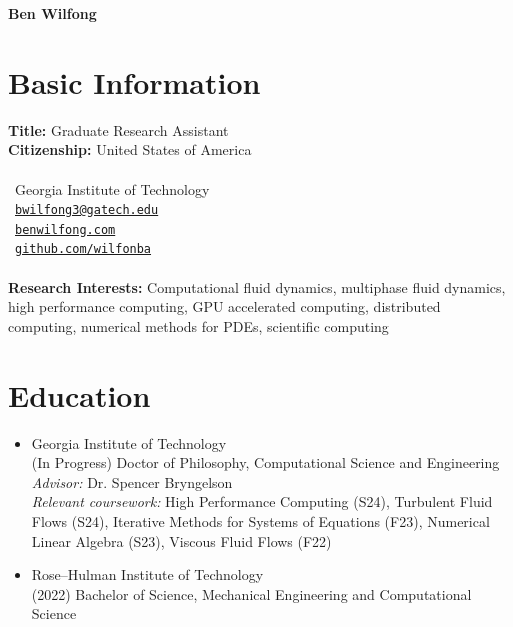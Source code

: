 \documentclass{article}
\begin{document}
\begin{center}
    \LARGE{\textbf{Ben Wilfong}}
\end{center}

\section{Basic Information}
\textbf{Title:} Graduate Research Assistant \\
\textbf{Citizenship:} United States of America \\~\\
\faBuilding\ Georgia Institute of Technology \\
\faEnvelopeSquare\ \href{mailto:bwilfong3@gatech.edu}{\texttt{bwilfong3@gatech.edu}} \\
\faArrowAltCircleRight\  \href{https://benwilfong.com}{\texttt{benwilfong.com}} \\
\faGithub\ \href{https://github.com/wilfonba}{\texttt{github.com/wilfonba}} \\~\\
\textbf{Research Interests:} Computational fluid dynamics, multiphase fluid dynamics, high performance computing, GPU accelerated computing, distributed computing, numerical methods for PDEs, scientific computing

\section{Education}
\begin{itemize}
    \item[\faGraduationCap] Georgia Institute of Technology \\
    \hspace*{0.25cm} (In Progress) Doctor of Philosophy, Computational Science and Engineering \\
    \hspace*{2.4cm} \textit{Advisor:} Dr. Spencer Bryngelson \\
    \hspace*{2.4cm} \textit{Relevant coursework:} High Performance Computing (S24), Turbulent Fluid 
    \hspace*{2.4cm} Flows (S24), Iterative Methods for Systems of Equations (F23), Numerical 
    \hspace*{2.4cm} Linear Algebra (S23), Viscous Fluid Flows (F22) \\
    \item[\faGraduationCap] Rose--Hulman Institute of Technology \\
    \hspace*{0.25cm} (2022) Bachelor of Science, Mechanical Engineering and Computational Science
\end{itemize}
\end{document}
